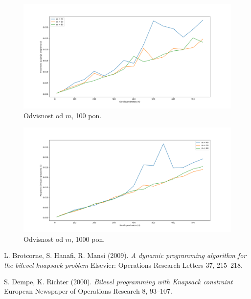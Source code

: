 \documentclass[a4paper, 11pt]{article}
\begin{document}
	
	\begin{figure}[h]
    	\centering
    		\includegraphics[scale=0.35]{Graf_3_100.png}
    		\caption{Odvisnost od $m$, 100 pon.}
    		\label{fig:graf5_100}
	\end{figure}
	
	\begin{figure}[h]
    	\centering
    		\includegraphics[scale=0.35]{Graf_3_1000.png}
    		\caption{Odvisnost od $m$, 1000 pon.}
    		\label{fig:graf6_1000}
	\end{figure}
	
		\clearpage
		
		\begin{thebibliography}{9}
		
			 L. Brotcorne, S. Hanafi, R. Mansi (2009).
			\textit{A dynamic programming algorithm for the bilevel knapsack problem} Elsevier: Operations Research Letters 37, 215–218.
			
    			 S. Dempe, K. Richter (2000). 
			\textit{Bilevel programming with Knapsack constraint} European Newspaper of Operations Research 8, 93–107.
			
		\end{thebibliography}
	
	
	
	
\end{document}
